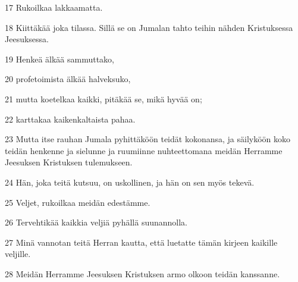 \par 17 Rukoilkaa lakkaamatta.
\par 18 Kiittäkää joka tilassa. Sillä se on Jumalan tahto teihin nähden Kristuksessa Jeesuksessa.
\par 19 Henkeä älkää sammuttako,
\par 20 profetoimista älkää halveksuko,
\par 21 mutta koetelkaa kaikki, pitäkää se, mikä hyvää on;
\par 22 karttakaa kaikenkaltaista pahaa.
\par 23 Mutta itse rauhan Jumala pyhittäköön teidät kokonansa, ja säilyköön koko teidän henkenne ja sielunne ja ruumiinne nuhteettomana meidän Herramme Jeesuksen Kristuksen tulemukseen.
\par 24 Hän, joka teitä kutsuu, on uskollinen, ja hän on sen myös tekevä.
\par 25 Veljet, rukoilkaa meidän edestämme.
\par 26 Tervehtikää kaikkia veljiä pyhällä suunannolla.
\par 27 Minä vannotan teitä Herran kautta, että luetatte tämän kirjeen kaikille veljille.
\par 28 Meidän Herramme Jeesuksen Kristuksen armo olkoon teidän kanssanne.


